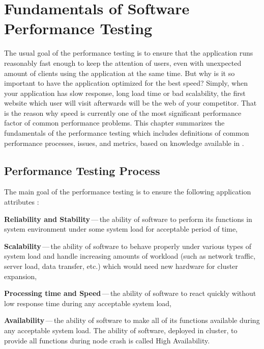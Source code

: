 
\chapter{Fundamentals of Software Performance Testing}
\label{Fundamentals of Software Performance Testing}
The usual goal of the performance testing is to ensure that the application runs reasonably fast enough to keep the attention of users, even with unexpected amount of clients using the application at the same time. But why is it so important to have the application optimized for the best speed? Simply, when your application has slow response, long load time or bad scalability, the first website which user will visit afterwards will be the web of your competitor. That is the reason why speed is currently one of the most significant performance factor of common performance problems. This chapter summarizes the fundamentals of the performance testing which includes definitions of common performance processes, issues, and metrics, based on knowledge available in \cite{Molyneaux:TAoAPT, Kurkova:Thesis:2017, DIN:PHD, ISTQB}.


\section{Performance Testing Process}
\label{Performance Testing Process}
The main goal of the performance testing is to ensure the following application attributes \cite{GAO:MEASURING}:

\begin{description}
	\setlength\itemsep{0em}
	\item \textbf{Reliability and Stability}\,---\,the ability of software to perform its functions in system environment under some system load for acceptable\footnotemark{} period of time,
	\item \textbf{Scalability}\,---\,the ability of software to behave properly under various types of system load and handle increasing amounts of workload (such as network traffic, server load, data transfer, etc.) which would need new hardware for cluster expansion,
	\item \textbf{Processing time and Speed}\,---\,the ability of software to react quickly without low response time during any acceptable system load,
	\item \textbf{Availability}\,---\,the ability of software to make all of its functions available during any acceptable system load. The ability of software, deployed in cluster, to provide all functions during node crash is called High Availability.
\end{description}

